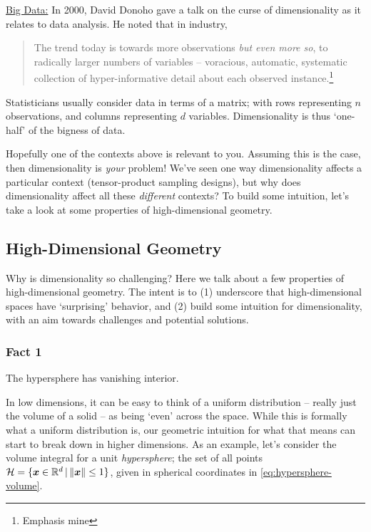 \documentclass{article}
\begin{document}
\bigskip\noindent\underline{Big Data:} In 2000, David Donoho gave a talk on the
curse of dimensionality as it relates to data analysis.\cite{donoho2000high}
He noted that in industry,

\begin{quote}
  The trend today is towards more observations \emph{but even more so},
  \textcolor{palered}{to radically larger numbers of variables} – voracious,
  automatic, systematic collection of hyper-informative detail about each
  observed instance.\footnote{Emphasis mine}
\end{quote}

Statisticians usually consider data in terms of a matrix; with rows representing
$n$ observations, and columns representing $d$ variables. Dimensionality is thus
`one-half' of the bigness of data.

Hopefully one of the contexts above is relevant to you. Assuming this is the
case, then dimensionality is \emph{your} problem! We've seen one way
dimensionality affects a particular context (tensor-product sampling designs),
but why does dimensionality affect all these \emph{different} contexts? To build
some intuition, let's take a look at some properties of high-dimensional
geometry.

\subsection{High-Dimensional Geometry}
Why is dimensionality so challenging? Here we talk about a few properties of
high-dimensional geometry. The intent is to (1) underscore that high-dimensional
spaces have `surprising' behavior, and (2) build some intuition for
dimensionality, with an aim towards challenges and potential solutions.

\subsubsection{Fact 1}
The hypersphere has vanishing interior.

\bigskip
In low dimensions, it can be easy to think of a uniform distribution -- really
just the volume of a solid -- as being `even' across the space. While this is
formally what a uniform distribution is, our geometric intuition for what that
means can start to break down in higher dimensions. As an example, let's
consider the volume integral for a unit \emph{hypersphere}; the set of all
points $\mathcal{H}=\{\boldsymbol{x}\in\mathbb{R}^{d}\,|\,\|\boldsymbol{x}\|\leq 1\}$, given in spherical coordinates
in \eqref{eq:hypersphere-volume}.
\end{document}

